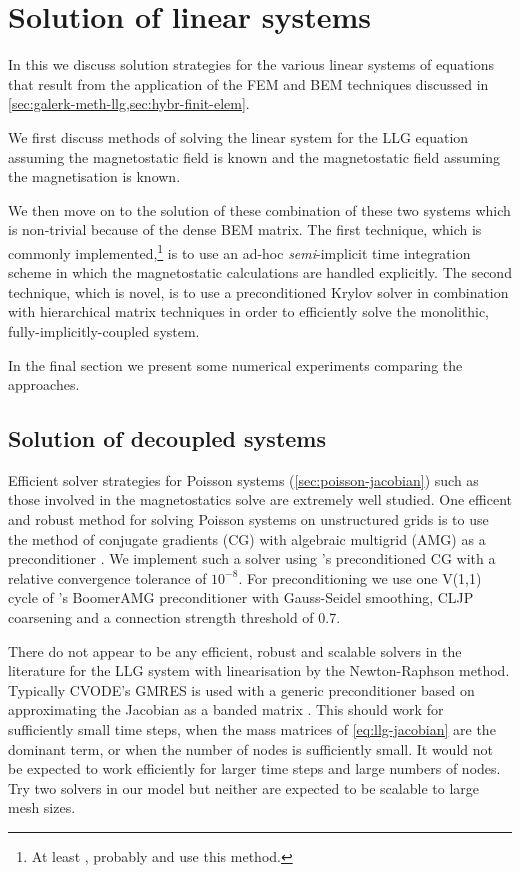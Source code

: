 \chapter{Solution of linear systems}
\label{sec:solution-strategies}

In this  we discuss solution strategies for the various linear systems of equations that result from the application of the FEM and BEM techniques discussed in \cref{sec:galerk-meth-llg,sec:hybr-finit-elem}.

We first discuss methods of solving the linear system for the LLG equation assuming the magnetostatic field is known and the magnetostatic field assuming the magnetisation is known.

We then move on to the solution of these combination of these two systems which is non-trivial because of the dense BEM matrix.
The first technique, which is commonly implemented,\footnote{At least \nmag, probably \magpar and \femme use this method.} is to use an ad-hoc \emph{semi}-implicit time integration scheme in which the magnetostatic calculations are handled explicitly.
The second technique, which is novel, is to use a preconditioned Krylov solver in combination with hierarchical matrix techniques in order to efficiently solve the monolithic, \ie fully-implicitly-coupled system.

In the final section we present some numerical experiments comparing the approaches.


\section{Solution of decoupled systems}
\label{sec:llg-only-system}

Efficient solver strategies for Poisson systems (\cref{sec:poisson-jacobian}) such as those involved in the magnetostatics solve are extremely well studied.
One efficent and robust method for solving Poisson systems on unstructured grids is to use the method of conjugate gradients (CG) with algebraic multigrid (AMG) as a preconditioner \cite[Chap. 2]{HowardElmanDavidSilvester2006}.
We implement such a solver using \oomph's preconditioned CG with a relative convergence tolerance of $10^{-8}$.
For preconditioning we use one V(1,1) cycle of \hypre's BoomerAMG preconditioner \cite{hypre} with Gauss-Seidel smoothing, CLJP coarsening and a connection strength threshold of 0.7.


There do not appear to be any efficient, robust and scalable solvers in the literature for the LLG system with linearisation by the Newton-Raphson method.
Typically CVODE's GMRES is used with a generic preconditioner based on approximating the Jacobian as a banded matrix \cite{nmag} \cite{Vasslios}.
This should work for sufficiently small time steps, \ie when the mass matrices of \cref{eq:llg-jacobian} are the dominant term, or when the number of nodes is sufficiently small.
It would not be expected to work efficiently for larger time steps and large numbers of nodes.
Try two solvers in our model but neither are expected to be scalable to large mesh sizes.

